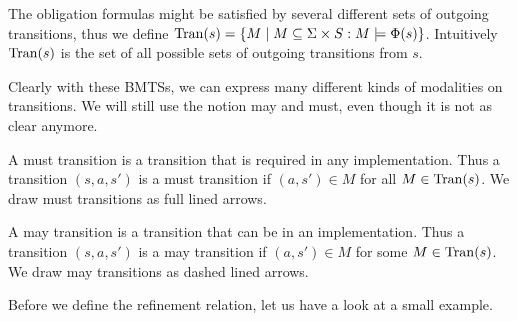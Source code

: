 The obligation formulas might be satisfied by several different sets of outgoing transitions, thus we define $\mathrm{Tran}(s) = \{ M \mid M \subseteq \Sigma \times S : M \models \mathrm{\Phi}(s)\}$. Intuitively $\mathrm{Tran}(s)$ is the set of all possible sets of outgoing transitions from $s$. 

Clearly with these BMTSs, we can express many different kinds of modalities on transitions. We will still use the notion may and must, even though it is not as clear anymore. 

A must transition is a transition that is required in any implementation. Thus a transition $(s,a,s')$ is a must transition if $(a,s') \in M$ for all $M \in \mathrm{Tran}(s)$. We draw must transitions as full lined arrows.

A may transition is a transition that can be in an implementation. Thus a transition $(s,a,s')$ is a may transition if $(a,s') \in M$ for some $M \in \mathrm{Tran}(s)$. We draw may transitions as dashed lined arrows.

% 	

% 	

% 	

% 	

Before we define the refinement relation, let us have a look at a small example. 

